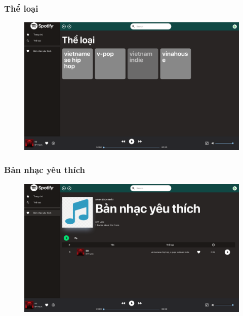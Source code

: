 \documentclass[a4paper]{article}
\begin{document}
\subsubsection{Thể loại}
\begin{figure}[h!]
\begin{center}
\includegraphics[width=12cm]{genres.png}
\end{center}
\end{figure}
\newpage

\subsubsection{Bản nhạc yêu thích}
\begin{figure}[h!]
\begin{center}
\includegraphics[width=12cm]{favorite.png}
\end{center}
\end{figure}
\end{document}
